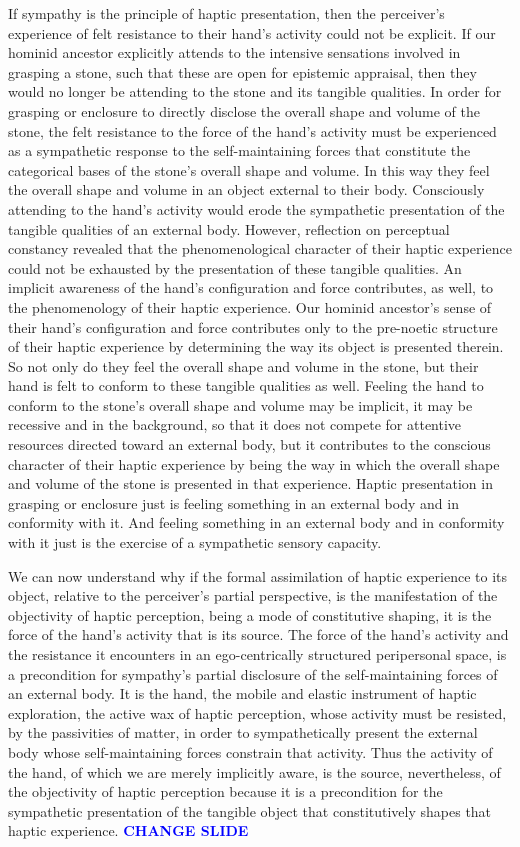 \documentclass[12pt]{article}
\newcommand{\change}{\textcolor{blue}{\textbf{CHANGE SLIDE}}}
\begin{document}
If sympathy is the principle of haptic presentation, then the perceiver's experience of felt resistance to their hand's activity could not be explicit. If our hominid ancestor explicitly attends to the intensive sensations involved in grasping a stone, such that these are open for epistemic appraisal, then they would no longer be attending to the stone and its tangible qualities. In order for grasping or enclosure to directly disclose the overall shape and volume of the stone, the felt resistance to the force of the hand's activity must be experienced as a sympathetic response to the self-maintaining forces that constitute the categorical bases of the stone's overall shape and volume. In this way they feel the overall shape and volume in an object external to their body. Consciously attending to the hand's activity would erode the sympathetic presentation of the tangible qualities of an external body. However, reflection on perceptual constancy revealed that the phenomenological character of their haptic experience could not be exhausted by the presentation of these tangible qualities. An implicit awareness of the hand's configuration and force contributes, as well, to the phenomenology of their haptic experience. Our hominid ancestor's sense of their hand’s configuration and force contributes only to the pre-noetic structure of their haptic experience by determining the way its object is presented therein. So not only do they feel the overall shape and volume in the stone, but their hand is felt to conform to these tangible qualities as well. Feeling the hand to conform to the stone's overall shape and volume may be implicit, it may be recessive and in the background, so that it does not compete for attentive resources directed toward an external body, but it contributes to the conscious character of their haptic experience by being the way in which the overall shape and volume of the stone is presented in that experience. Haptic presentation in grasping or enclosure just is feeling something in an external body and in conformity with it. And feeling something in an external body and in conformity with it just is the exercise of a sympathetic sensory capacity.

We can now understand why if the formal assimilation of haptic experience to its object, relative to the perceiver's partial perspective, is the manifestation of the objectivity of haptic perception, being a mode of constitutive shaping, it is the force of the hand's activity that is its source. The force of the hand's activity and the resistance it encounters in an ego-centrically structured peripersonal space, is a precondition for sympathy's partial disclosure of the self-maintaining forces of an external body. It is the hand, the mobile and elastic instrument of haptic exploration, the active wax of haptic perception, whose activity must be resisted, by the passivities of matter, in order to sympathetically present the external body whose self-maintaining forces constrain that activity. Thus the activity of the hand, of which we are merely implicitly aware, is the source, nevertheless, of the objectivity of haptic perception because it is a precondition for the sympathetic presentation of the tangible object that constitutively shapes that haptic experience. \change
 
\end{document}
